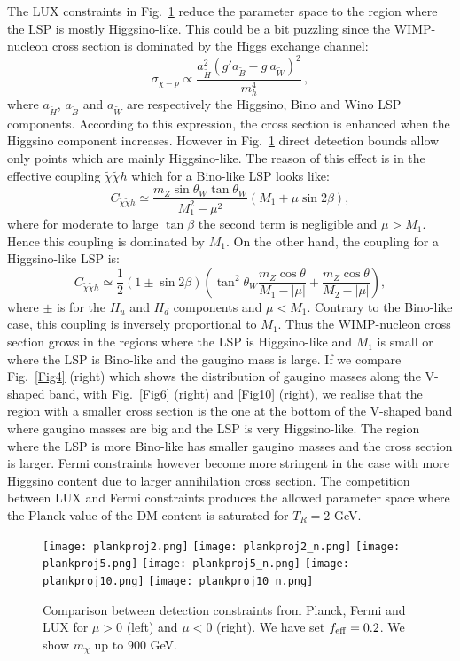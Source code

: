 \documentclass[11pt,a4paper]{article}
\newcommand{\be}{\begin{equation}}
\newcommand{\ee}{\end{equation}}
\begin{document}
The LUX constraints in Fig.~\ref{Fig14} reduce the parameter space to the region where the LSP is mostly Higgsino-like. This could be a bit puzzling since the WIMP-nucleon cross section is dominated by the Higgs exchange channel:
\be
\sigma_{\chi-p} \propto \frac{a_{\tilde H}^2 (g' a_{\tilde B} - g \ a_{\tilde W})^2}{m_h^4}\,,
\label{xip}
\ee
where $a_{\tilde H}$, $a_{\tilde B}$ and $a_{\tilde W}$ are respectively the Higgsino, Bino and Wino LSP components. According to this expression, the cross section is enhanced when the Higgsino component increases. However in Fig.~\ref{Fig14} direct detection bounds allow only points which are mainly Higgsino-like. The reason of this effect is in the effective coupling $\tilde{\chi} \tilde{\chi}  h$ which for a Bino-like LSP looks like:
\be
C_{\tilde{\chi}\tilde{\chi} h} \simeq \frac{m_Z \sin \theta_W \tan \theta_W}{M_1^2 -\mu^2}\left( M_1 + \mu \sin 2\beta \right),
\label{Cb}
\ee
where for moderate to large $\tan \beta$ the second term is negligible and $\mu > M_1$. Hence this coupling is dominated by $M_1$. On the other hand, the coupling for a Higgsino-like LSP is:
\be
C_{\tilde{\chi}\tilde{\chi} h} \simeq \frac{1}{2}\left( 1 \pm \sin 2\beta  \right)\left( \tan^2 \theta_W\frac{m_Z \cos \theta}{M_1 - |\mu|} +\frac{m_Z \cos \theta}{M_2 - |\mu|} \right),
\label{Cn}
\ee
where $\pm$ is for the $H_u$ and $H_d$ components and $\mu < M_1$. Contrary to the Bino-like case, this coupling is inversely proportional to $M_1$. 
Thus the WIMP-nucleon cross section grows in the regions where the LSP is Higgsino-like and $M_1$ is small or where the LSP is Bino-like and the gaugino mass is large. If we compare Fig.~\ref{Fig4} (right) which shows the distribution of gaugino masses along the V-shaped band, with Fig.~\ref{Fig6} (right) and \ref{Fig10} (right), we realise that the region with a smaller cross section is the one at the bottom of the V-shaped band where gaugino masses are big and the LSP is very Higgsino-like. The region where the LSP is more Bino-like has smaller gaugino masses and the cross section is larger.
Fermi constraints however become more stringent in the case with more Higgsino content due to larger annihilation cross section. The competition between LUX and Fermi constraints produces the allowed parameter space where the Planck value of the DM content is saturated for $T_R=2$ GeV.


\begin{figure}[!ht]
\centering
\texttt{[image: plankproj2.png]}
\texttt{[image: plankproj2\_n.png]}
\texttt{[image: plankproj5.png]}
\texttt{[image: plankproj5\_n.png]}
\texttt{[image: plankproj10.png]}
\texttt{[image: plankproj10\_n.png]}
\caption{Comparison between detection constraints from Planck, Fermi and LUX for $\mu>0$ (left) and $\mu<0$ (right). We have set $f_{\rm eff}= 0.2$. We show $m_{\chi}$ up to 900 GeV.}
\label{Fig14}
\end{figure}
\end{document}
